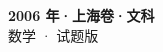\documentclass[zihao=-4, a4paper]{ctexart}
\begin{document}
\begin{center}
  {\Large\bfseries 2006 年·上海卷·文科}\\[4pt]
  {\large 数学 · 试题版}
\end{center}
\medskip
{}

\end{document}
